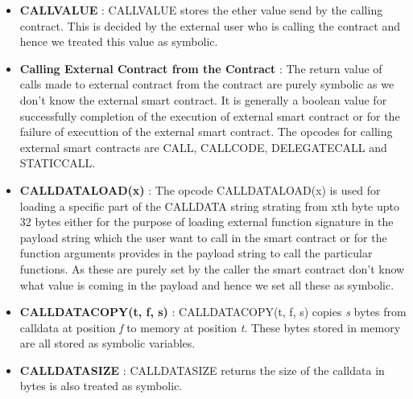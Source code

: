 \documentclass{article}
\begin{document}
\begin{itemize}
    \item \textbf{CALLVALUE} : CALLVALUE stores the ether value send by the calling contract. This is decided by the external user who is calling the contract and hence we treated this value as symbolic.
    \item \textbf{Calling External Contract from the Contract} : The return value of calls made to external contract from the contract are purely symbolic as we don't know the external smart contract. It is generally a boolean value for successfully completion of the execution of external smart contract or for the failure of executtion of the external smart contract. The opcodes for calling external smart contracts are CALL, CALLCODE, DELEGATECALL and STATICCALL.
    \item \textbf{CALLDATALOAD(x)} : The opcode CALLDATALOAD(x) is used for loading a specific part of the CALLDATA string strating from xth byte upto 32 bytes either for the purpose of loading external function signature in the payload string which the user want to call in the smart contract or for the function arguments provides in the payload string to call the particular functions. As these are purely set by the caller the smart contract don't know what value is coming in the payload and hence we set all these as symbolic.
    \item \textbf{CALLDATACOPY(t, f, s)} : CALLDATACOPY(t, f, s) copies \emph{s} bytes from calldata at position \emph{f} to memory at position \emph{t}. These bytes stored in memory are all stored as symbolic variables.
    \item \textbf{CALLDATASIZE} : CALLDATASIZE returns the size of the calldata in bytes is also treated as symbolic.
\end{itemize}
    
\end{document}
